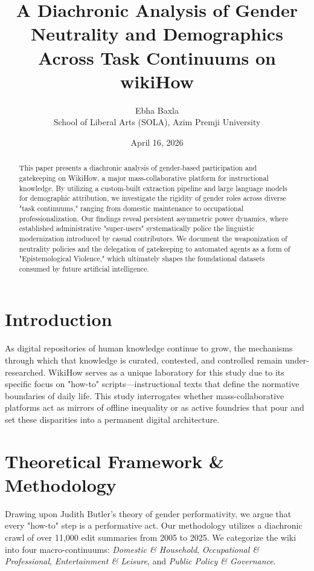 \documentclass[11pt,a4paper]{article}
\title{A Diachronic Analysis of Gender Neutrality and Demographics Across Task Continuums on wikiHow}
\author{Ebha Baxla \\ School of Liberal Arts (SOLA), Azim Premji University}
\date{April 16, 2026}
\begin{document}
\maketitle

\begin{abstract}
This paper presents a diachronic analysis of gender-based participation and gatekeeping on WikiHow, a major mass-collaborative platform for instructional knowledge. By utilizing a custom-built extraction pipeline and large language models for demographic attribution, we investigate the rigidity of gender roles across diverse "task continuums," ranging from domestic maintenance to occupational professionalization. Our findings reveal persistent asymmetric power dynamics, where established administrative "super-users" systematically police the linguistic modernization introduced by casual contributors. We document the weaponization of neutrality policies and the delegation of gatekeeping to automated agents as a form of "Epistemological Violence," which ultimately shapes the foundational datasets consumed by future artificial intelligence.
\end{abstract}

\section{Introduction}
As digital repositories of human knowledge continue to grow, the mechanisms through which that knowledge is curated, contested, and controlled remain under-researched. WikiHow serves as a unique laboratory for this study due to its specific focus on "how-to" scripts—instructional texts that define the normative boundaries of daily life. This study interrogates whether mass-collaborative platforms act as mirrors of offline inequality or as active foundries that pour and set these disparities into a permanent digital architecture.

\section{Theoretical Framework \& Methodology}
Drawing upon Judith Butler's theory of gender performativity, we argue that every "how-to" step is a performative act. Our methodology utilizes a diachronic crawl of over 11,000 edit summaries from 2005 to 2025. We categorize the wiki into four macro-continuums: \textit{Domestic \& Household}, \textit{Occupational \& Professional}, \textit{Entertainment \& Leisure}, and \textit{Public Policy \& Governance}.
\end{document}
